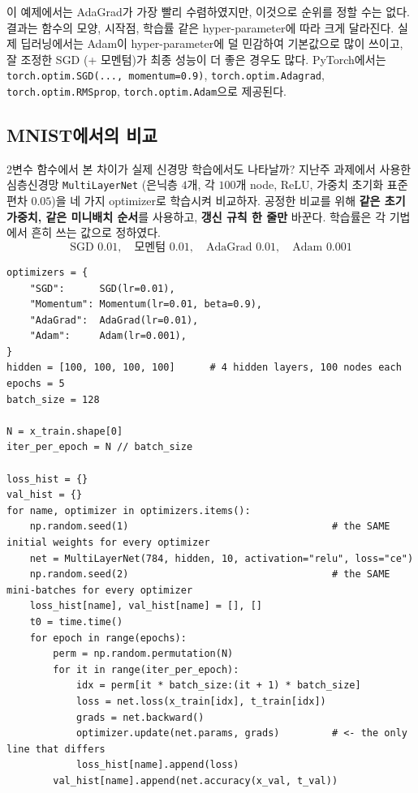 \documentclass[11pt,a4paper]{article}
\begin{document}
\begin{remarkbox}
이 예제에서는 AdaGrad가 가장 빨리 수렴하였지만, 이것으로 순위를 정할 수는 없다.
결과는 함수의 모양, 시작점, 학습률 같은 hyper-parameter에 따라 크게 달라진다.
실제 딥러닝에서는 Adam이 hyper-parameter에 덜 민감하여 기본값으로 많이 쓰이고,
잘 조정한 SGD (+ 모멘텀)가 최종 성능이 더 좋은 경우도 많다.
PyTorch에서는 \texttt{torch.optim.SGD(..., momentum=0.9)}, \texttt{torch.optim.Adagrad},
\texttt{torch.optim.RMSprop}, \texttt{torch.optim.Adam}으로 제공된다.
\end{remarkbox}



\subsection{MNIST에서의 비교}\label{sec:mnistopt}

2변수 함수에서 본 차이가 실제 신경망 학습에서도 나타날까?
지난주 과제에서 사용한 심층신경망 \texttt{MultiLayerNet}
(은닉층 $4$개, 각 $100$개 node, ReLU, 가중치 초기화 표준편차 $0.05$)을
네 가지 optimizer로 학습시켜 비교하자.
공정한 비교를 위해 \textbf{같은 초기 가중치, 같은 미니배치 순서}를 사용하고,
\textbf{갱신 규칙 한 줄만} 바꾼다.
학습률은 각 기법에서 흔히 쓰는 값으로 정하였다.
\[
\text{SGD }0.01,\quad \text{모멘텀 }0.01,\quad \text{AdaGrad }0.01,\quad \text{Adam }0.001
\]

\begin{lstlisting}
optimizers = {
    "SGD":      SGD(lr=0.01),
    "Momentum": Momentum(lr=0.01, beta=0.9),
    "AdaGrad":  AdaGrad(lr=0.01),
    "Adam":     Adam(lr=0.001),
}
hidden = [100, 100, 100, 100]      # 4 hidden layers, 100 nodes each
epochs = 5
batch_size = 128

N = x_train.shape[0]
iter_per_epoch = N // batch_size

loss_hist = {}
val_hist = {}
for name, optimizer in optimizers.items():
    np.random.seed(1)                                   # the SAME initial weights for every optimizer
    net = MultiLayerNet(784, hidden, 10, activation="relu", loss="ce")
    np.random.seed(2)                                   # the SAME mini-batches for every optimizer
    loss_hist[name], val_hist[name] = [], []
    t0 = time.time()
    for epoch in range(epochs):
        perm = np.random.permutation(N)
        for it in range(iter_per_epoch):
            idx = perm[it * batch_size:(it + 1) * batch_size]
            loss = net.loss(x_train[idx], t_train[idx])
            grads = net.backward()
            optimizer.update(net.params, grads)         # <- the only line that differs
            loss_hist[name].append(loss)
        val_hist[name].append(net.accuracy(x_val, t_val))
\end{lstlisting}
\end{document}
